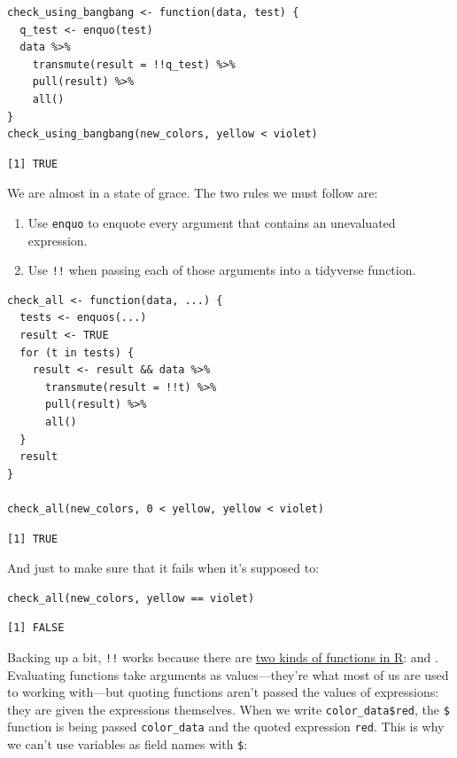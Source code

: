 \begin{lstlisting}
check_using_bangbang <- function(data, test) {
  q_test <- enquo(test)
  data %>%
    transmute(result = !!q_test) %>%
    pull(result) %>%
    all()
}
check_using_bangbang(new_colors, yellow < violet)
\end{lstlisting}

\begin{lstlisting}
[1] TRUE
\end{lstlisting}

We are almost in a state of grace.
The two rules we must follow are:

\begin{enumerate}
\item
  Use \texttt{enquo} to enquote every argument that contains an unevaluated expression.
\item
  Use \texttt{!!} when passing each of those arguments into a tidyverse function.
\end{enumerate}

\begin{lstlisting}
check_all <- function(data, ...) {
  tests <- enquos(...)
  result <- TRUE
  for (t in tests) {
    result <- result && data %>%
      transmute(result = !!t) %>%
      pull(result) %>%
      all()
  }
  result
}

check_all(new_colors, 0 < yellow, yellow < violet)
\end{lstlisting}

\begin{lstlisting}
[1] TRUE
\end{lstlisting}

\noindent
And just to make sure that it fails when it's supposed to:

\begin{lstlisting}
check_all(new_colors, yellow == violet)
\end{lstlisting}

\begin{lstlisting}
[1] FALSE
\end{lstlisting}

Backing up a bit,
\texttt{!!} works because there are
\href{https://tidyeval.tidyverse.org/getting-up-to-speed.html\#whats-special-about-quoting-functions}{two kinds of functions in R}:
 and
.
Evaluating functions take arguments as values---they're what most of us are used to working with---but
quoting functions aren't passed the values of expressions:
they are given the expressions themselves.
When we write \texttt{color\_data\$red},
the \texttt{\$} function is being passed \texttt{color\_data} and the quoted expression \texttt{red}.
This is why we can't use variables as field names with \texttt{\$}:

